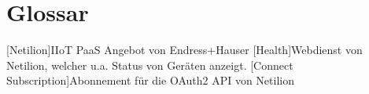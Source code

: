 \chapter{Glossar}

\begin{acronym}[Glossar]
  [Netilion]{IIoT PaaS Angebot von Endress+Hauser}
  [Health]{Webdienst von Netilion, welcher u.a. Status von Geräten anzeigt.}
  [Connect Subscription]{Abonnement für die OAuth2 API von Netilion}
\end{acronym}

